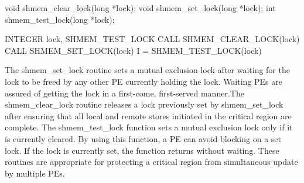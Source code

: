 \synC
void shmem_clear_lock(long *lock);
void shmem_set_lock(long *lock);
int shmem_test_lock(long *lock);

\synF   %
INTEGER lock, SHMEM_TEST_LOCK
CALL SHMEM_CLEAR_LOCK(lock)
CALL SHMEM_SET_LOCK(lock)
I = SHMEM_TEST_LOCK(lock)

{
       The shmem\_set\_lock routine sets a mutual exclusion lock after  waiting
       for  the lock  to be freed by any other PE currently holding the lock.
       Waiting PEs  are  assured  of  getting	the  lock  in  a   first-come,
       first-served manner.The   shmem\_clear\_lock  routine releases  a  lock  previously  set  by
       shmem\_set\_lock  after  ensuring that  all  local  and  remote	stores
       initiated in the critical region are complete. The shmem\_test\_lock function sets a mutual exclusion lock only if it is
       currently cleared.  By using this function, a PE can avoid blocking  on
       a set lock.  If the lock is currently set, the function returns without
       waiting. These routines are appropriate for protecting a critical  region  from
       simultaneous  update  by multiple  PEs.	  
}
{

}

\eAPI